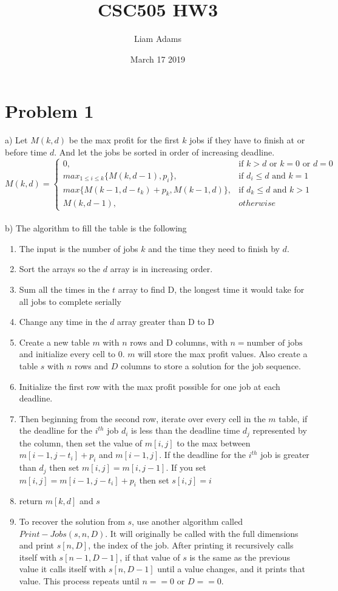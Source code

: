 \documentclass{article}
\title{CSC505 HW3}
\author{Liam Adams}
\date{March 17 2019}
\begin{document}
\maketitle

\section*{Problem 1}
a) Let $M(k,d)$ be the max profit for the first $k$ jobs if they have to finish at or before time $d$.  And let the jobs be sorted in order of increasing deadline.
\[
    M(k,d)= 
\begin{cases}
    0,& \text{if } k>d \text{ or } k=0 \text{ or } d=0\\
    max_{1\leq i \leq k}\{M(k, d-1), p_i\}, & \text{if } d_i\leq d \text{ and } k=1\\
    max\{M(k-1, d-t_k) + p_k, M(k-1, d)\}, & \text{if } d_k\leq d \text{ and } k > 1\\
    M(k, d-1), & otherwise
\end{cases}
\]\\
b) The algorithm to fill the table is the following
\begin{enumerate}
  \item The input is the number of jobs $k$ and the time they need to finish by $d$.
  \item Sort the arrays so the $d$ array is in increasing order.
  \item Sum all the times in the $t$ array to find D, the longest time it would take for all jobs to complete serially
  \item Change any time in the $d$ array greater than D to D
  \item Create a new table $m$ with $n$ rows and D columns, with $n=\text{number of jobs}$ and initialize every cell to 0.  $m$ will store the max profit values.  Also create a table $s$ with $n$ rows and $D$ columns to store a solution for the job sequence.
  \item Initialize the first row with the max profit possible for one job at each deadline.
  \item Then beginning from the second row, iterate over every cell in the $m$ table, if the deadline for the $i^{th}$ job $d_i$ is less than the deadline time $d_j$ represented by the column, then set the value of $m[i,j]$ to the max between $m[i-1, j-t_i] + p_i$ and $m[i-1, j]$.  If the deadline for the $i^{th}$ job is greater than $d_j$ then set $m[i,j]=m[i, j-1]$. If you set $m[i,j]=m[i-1, j-t_i] + p_i$ then set $s[i,j]=i$ 
  \item return $m[k, d]$ and $s$
  \item To recover the solution from $s$, use another algorithm called $Print-Jobs(s, n, D)$.  It will originally be called with the full dimensions and print $s[n, D]$, the index of the job.  After printing it recursively calls itself with $s[n-1, D-1]$, if that value of $s$ is the same as the previous value it calls itself with $s[n, D-1]$ until a value changes, and it prints that value.  This process repeats until $n==0$ or $D==0$.
\end{enumerate}
\end{document}
